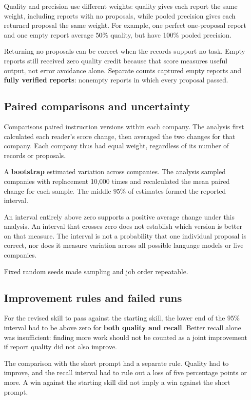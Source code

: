 \documentclass[11pt]{article}
\begin{document}
Quality and precision use different weights: quality gives each report the same weight, including reports with no proposals, while pooled precision gives each returned proposal the same weight. For example, one perfect one-proposal report and one empty report average 50\% quality, but have 100\% pooled precision.

Returning no proposals can be correct when the records support no task. Empty reports still received zero quality credit because that score measures useful output, not error avoidance alone. Separate counts captured empty reports and \textbf{fully verified reports}: nonempty reports in which every proposal passed.

\subsection{Paired comparisons and uncertainty}
Comparisons paired instruction versions within each company. The analysis first calculated each reader's score change, then averaged the two changes for that company. Each company thus had equal weight, regardless of its number of records or proposals.

A \textbf{bootstrap} estimated variation across companies. The analysis sampled companies with replacement 10,000 times and recalculated the mean paired change for each sample. The middle 95\% of estimates formed the reported interval.

An interval entirely above zero supports a positive average change under this analysis. An interval that crosses zero does not establish which version is better on that measure. The interval is not a probability that one individual proposal is correct, nor does it measure variation across all possible language models or live companies.

Fixed random seeds made sampling and job order repeatable.

\subsection{Improvement rules and failed runs}
For the revised skill to pass against the starting skill, the lower end of the 95\% interval had to be above zero for \textbf{both quality and recall}. Better recall alone was insufficient: finding more work should not be counted as a joint improvement if report quality did not also improve.

The comparison with the short prompt had a separate rule. Quality had to improve, and the recall interval had to rule out a loss of five percentage points or more. A win against the starting skill did not imply a win against the short prompt.
\end{document}
